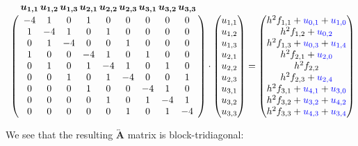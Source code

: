 \documentclass[11pt]{report}
\begin{document}
\begin{equation*}
\let\quad\thinspace
\bordermatrix{\text{}& \bm{u_{1,1}} & \bm{u_{1,2}} & \bm{u_{1,3}} & \bm{u_{2,1}} & \bm{u_{2,2}} & \bm{u_{2,3}} & \bm{u_{3,1}} & \bm{u_{3,2}} & \bm{u_{3,3}} \cr
   & -4 & 1 & 0 & 1 & 0 & 0 & 0 & 0 & 0  \cr
   & 1 & -4 & 1 & 0 & 1 & 0 & 0 & 0 & 0  \cr
   & 0 & 1 & -4 & 0 & 0 & 1 & 0 & 0 & 0  \cr 
   & 1 & 0 & 0 & -4 & 1 & 0 & 1 & 0 & 0  \cr
   & 0 & 1 & 0 & 1 & -4 & 1 & 0 & 1 & 0  \cr
   & 0 & 0 & 1 & 0 & 1 & -4 & 0 & 0 & 1  \cr
   & 0 & 0 & 0 & 1 & 0 & 0 & -4 & 1 & 0  \cr
   & 0 & 0 & 0 & 0 & 1 & 0 & 1 & -4 & 1  \cr
   & 0 & 0 & 0 & 0 & 0 & 1 & 0 & 1 & -4 
    }
\cdot
\begin{pmatrix}
u_{1,1} \\ u_{1,2} \\ u_{1,3} \\ u_{2,1} \\ u_{2,2} \\ u_{2,3} \\ u_{3,1} \\ u_{3,2} \\ u_{3,3}
\end{pmatrix}
=
\begin{pmatrix}
h^2f_{1,1} + \textcolor{blue}{u_{0,1}} + \textcolor{blue}{u_{1,0}} \\ 
h^2f_{1,2} + \textcolor{blue}{u_{0,2}} \\ 
h^2f_{1,3} + \textcolor{blue}{u_{0,3}} + \textcolor{blue}{u_{1,4}} \\
h^2f_{2,1} + \textcolor{blue}{u_{2,0}} \\
h^2f_{2,2} \\
h^2f_{2,3} + \textcolor{blue}{u_{2,4}} \\
h^2f_{3,1} + \textcolor{blue}{u_{4,1}} + \textcolor{blue}{u_{3,0}} \\
h^2f_{3,2} + \textcolor{blue}{u_{3,2}} + \textcolor{blue}{u_{4,2}} \\
h^2f_{3,3} + \textcolor{blue}{u_{4,3}} + \textcolor{blue}{u_{3,4}}
\end{pmatrix}
\end{equation*}
\vspace{0.75cm}

We see that the resulting $\overleftrightarrow{\textbf{A}}$ matrix is block-tridiagonal:
\end{document}
